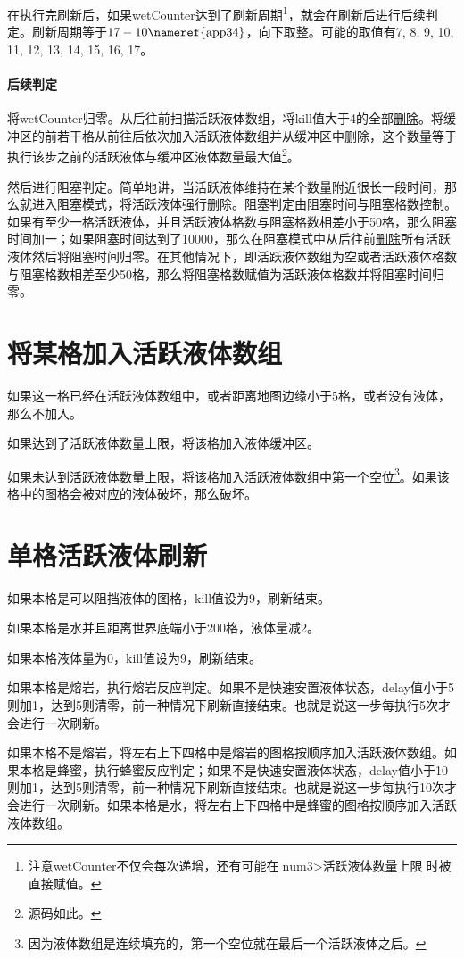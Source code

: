在执行完刷新后，如果wetCounter达到了刷新周期\footnote{注意wetCounter不仅会每次递增，还有可能在$\textrm{num3}>\textrm{活跃液体数量上限}$时被直接赋值。}，就会在刷新后进行后续判定。刷新周期等于$17-10\mbox{\nameref{app34}}$，向下取整。可能的取值有7, 8, 9, 10, 11, 12, 13, 14, 15, 16, 17。

\paragraph*{后续判定}\label{app29}
将wetCounter归零。从后往前扫描活跃液体数组，将kill值大于4的全部\hyperref[app28]{删除}。将缓冲区的前若干格从前往后依次加入活跃液体数组并从缓冲区中删除，这个数量等于执行该步之前的活跃液体与缓冲区液体数量最大值\footnote{源码如此。}。

然后进行阻塞判定。简单地讲，当活跃液体维持在某个数量附近很长一段时间，那么就进入阻塞模式，将活跃液体强行删除。阻塞判定由阻塞时间与阻塞格数控制。如果有至少一格活跃液体，并且活跃液体格数与阻塞格数相差小于50格，那么阻塞时间加一；如果阻塞时间达到了10000，那么在阻塞模式中从后往前\hyperref[app28]{删除}所有活跃液体然后将阻塞时间归零。在其他情况下，即活跃液体数组为空或者活跃液体格数与阻塞格数相差至少50格，那么将阻塞格数赋值为活跃液体格数并将阻塞时间归零。

\section{将某格加入活跃液体数组}
如果这一格已经在活跃液体数组中，或者距离地图边缘小于5格，或者没有液体，那么不加入。

如果达到了活跃液体数量上限，将该格加入液体缓冲区。

如果未达到活跃液体数量上限，将该格加入活跃液体数组中第一个空位\footnote{因为液体数组是连续填充的，第一个空位就在最后一个活跃液体之后。}。如果该格中的图格会被对应的液体破坏，那么破坏。

\section{单格活跃液体刷新}\label{app26}
如果本格是可以阻挡液体的图格，kill值设为9，刷新结束。

如果本格是水并且距离世界底端小于200格，液体量减2。

如果本格液体量为0，kill值设为9，刷新结束。

如果本格是熔岩，执行熔岩反应判定。如果不是快速安置液体状态，delay值小于5则加1，达到5则清零，前一种情况下刷新直接结束。也就是说这一步每执行5次才会进行一次刷新。

如果本格不是熔岩，将左右上下四格中是熔岩的图格按顺序加入活跃液体数组。如果本格是蜂蜜，执行蜂蜜反应判定；如果不是快速安置液体状态，delay值小于10则加1，达到5则清零，前一种情况下刷新直接结束。也就是说这一步每执行10次才会进行一次刷新。如果本格是水，将左右上下四格中是蜂蜜的图格按顺序加入活跃液体数组。

